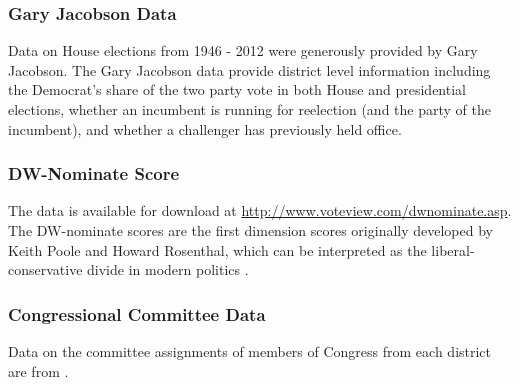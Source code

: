 \documentclass[12pt,final,fleqn]{article}
\theoremstyle{plain}
\begin{document}
\subsubsection{Gary Jacobson Data}
Data on House elections from 1946 - 2012 were generously provided by Gary Jacobson. The Gary Jacobson data provide district level information including the Democrat's share of the two party vote in both House and presidential elections, whether an incumbent is running for reelection (and the party of the incumbent), and whether a challenger has previously held office.

\subsubsection{DW-Nominate Score}
The data is available for download at \url{http://www.voteview.com/dwnominate.asp}. The DW-nominate scores are the first dimension scores originally developed by Keith Poole and Howard Rosenthal, which can be interpreted as the liberal-conservative divide in modern politics \citep{poole1997congress, poole2011ideology}.

\subsubsection{Congressional Committee Data}
Data on the committee assignments of members of Congress from each district are from \citep{stewart2015}.
\end{document}
